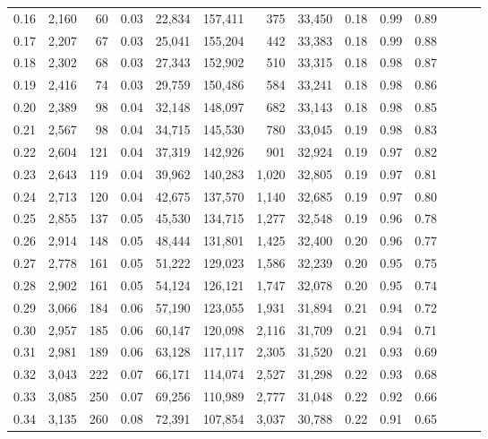 \begin{tabular}{rrrrrrrrrrrrrr}
0.16 &  2,160 &   60 &  0.03 &   22,834 &  157,411 &     375 &  33,450 &  0.18 &  0.99 &      0.89 \\
0.17 &  2,207 &   67 &  0.03 &   25,041 &  155,204 &     442 &  33,383 &  0.18 &  0.99 &      0.88 \\
0.18 &  2,302 &   68 &  0.03 &   27,343 &  152,902 &     510 &  33,315 &  0.18 &  0.98 &      0.87 \\
0.19 &  2,416 &   74 &  0.03 &   29,759 &  150,486 &     584 &  33,241 &  0.18 &  0.98 &      0.86 \\
0.20 &  2,389 &   98 &  0.04 &   32,148 &  148,097 &     682 &  33,143 &  0.18 &  0.98 &      0.85 \\
0.21 &  2,567 &   98 &  0.04 &   34,715 &  145,530 &     780 &  33,045 &  0.19 &  0.98 &      0.83 \\
0.22 &  2,604 &  121 &  0.04 &   37,319 &  142,926 &     901 &  32,924 &  0.19 &  0.97 &      0.82 \\
0.23 &  2,643 &  119 &  0.04 &   39,962 &  140,283 &   1,020 &  32,805 &  0.19 &  0.97 &      0.81 \\
0.24 &  2,713 &  120 &  0.04 &   42,675 &  137,570 &   1,140 &  32,685 &  0.19 &  0.97 &      0.80 \\
0.25 &  2,855 &  137 &  0.05 &   45,530 &  134,715 &   1,277 &  32,548 &  0.19 &  0.96 &      0.78 \\
0.26 &  2,914 &  148 &  0.05 &   48,444 &  131,801 &   1,425 &  32,400 &  0.20 &  0.96 &      0.77 \\
0.27 &  2,778 &  161 &  0.05 &   51,222 &  129,023 &   1,586 &  32,239 &  0.20 &  0.95 &      0.75 \\
0.28 &  2,902 &  161 &  0.05 &   54,124 &  126,121 &   1,747 &  32,078 &  0.20 &  0.95 &      0.74 \\
0.29 &  3,066 &  184 &  0.06 &   57,190 &  123,055 &   1,931 &  31,894 &  0.21 &  0.94 &      0.72 \\
0.30 &  2,957 &  185 &  0.06 &   60,147 &  120,098 &   2,116 &  31,709 &  0.21 &  0.94 &      0.71 \\
0.31 &  2,981 &  189 &  0.06 &   63,128 &  117,117 &   2,305 &  31,520 &  0.21 &  0.93 &      0.69 \\
0.32 &  3,043 &  222 &  0.07 &   66,171 &  114,074 &   2,527 &  31,298 &  0.22 &  0.93 &      0.68 \\
0.33 &  3,085 &  250 &  0.07 &   69,256 &  110,989 &   2,777 &  31,048 &  0.22 &  0.92 &      0.66 \\
0.34 &  3,135 &  260 &  0.08 &   72,391 &  107,854 &   3,037 &  30,788 &  0.22 &  0.91 &      0.65 \\

\end{tabular}
